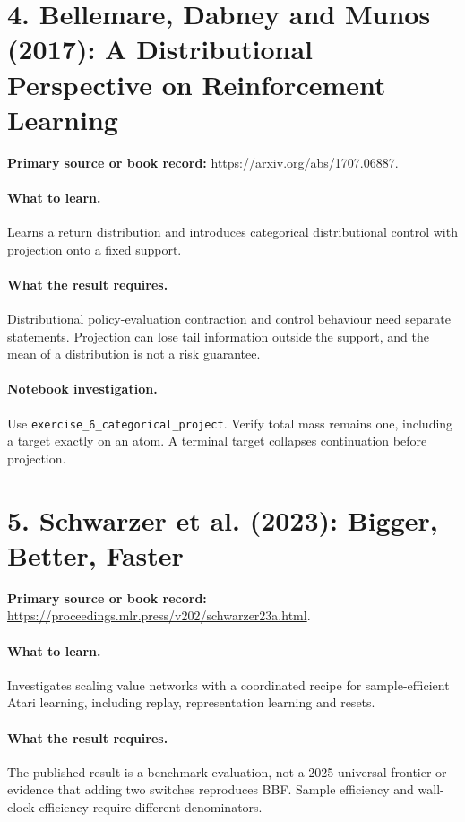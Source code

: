 \documentclass[11pt]{scrartcl}
\begin{document}
\section*{4. Bellemare, Dabney and Munos (2017): A Distributional Perspective on Reinforcement Learning}
\textbf{Primary source or book record:} \url{https://arxiv.org/abs/1707.06887}.

\paragraph{What to learn.} Learns a return distribution and introduces categorical distributional control with projection onto a fixed support.

\paragraph{What the result requires.} Distributional policy-evaluation contraction and control behaviour need separate statements. Projection can lose tail information outside the support, and the mean of a distribution is not a risk guarantee.

\paragraph{Notebook investigation.} Use \texttt{exercise\_6\_categorical\_project}. Verify total mass remains one, including a target exactly on an atom. A terminal target collapses continuation before projection.

\section*{5. Schwarzer et al. (2023): Bigger, Better, Faster}
\textbf{Primary source or book record:} \url{https://proceedings.mlr.press/v202/schwarzer23a.html}.

\paragraph{What to learn.} Investigates scaling value networks with a coordinated recipe for sample-efficient Atari learning, including replay, representation learning and resets.

\paragraph{What the result requires.} The published result is a benchmark evaluation, not a 2025 universal frontier or evidence that adding two switches reproduces BBF. Sample efficiency and wall-clock efficiency require different denominators.
\end{document}
